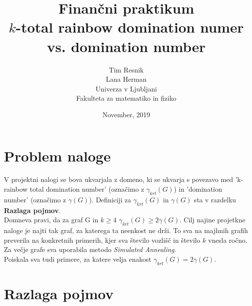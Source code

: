 \documentclass[a4paper]{article}
\title{Finančni praktikum \\\vspace{2cm} {\huge $k$-total rainbow domination numer vs. domination number}\vspace{2cm}}
\author{Tim Resnik \\[1.5mm] Lana Herman \\[1.5mm]\vspace{6cm}
Univerza v Ljubljani \\[1.5mm]
Fakulteta za matematiko in fiziko \vspace{2cm}}
\date{November, 2019}
\begin{document}
\begin{titlepage}
\clearpage \maketitle
\thispagestyle{empty}
\end{titlepage}

\tableofcontents
\pagebreak

\section{Problem naloge}

V projektni nalogi se bova ukvarjala z domeno, ki se ukvarja s povezavo med 'k-rainbow total domination number' (označimo z $\gamma_{krt}(G)$)  in 'domination number' (označimo z $\gamma(G)$). Definiciji za $\gamma_{krt}(G)$ in $\gamma(G)$ sta v razdelku \textbf{Razlaga pojmov}.\\
Domneva pravi, da za graf G in $k \geq 4$  $\gamma_{krt}(G) \geq 2\gamma(G)$. Cilj najine projetkne naloge je najti tak graf, za katerega ta neenkost ne drži. To sva na majhnih grafih preverila na konkretnih primerih, kjer sva število vozlišč in število $k$ vnesla ročno. Za večje grafe sva uporabila metodo \textit{Simulated Annealing}.\\
Poiskala sva tudi primere, za katere velja enakost $\gamma_{krt}(G) = 2\gamma(G)$.

\section{Razlaga pojmov}
\end{document}
